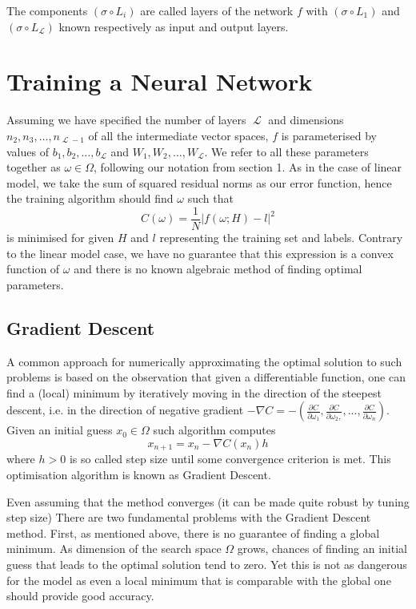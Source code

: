 \documentclass[a4paper]{article}
\theoremstyle{break}
\DeclareMathOperator{\La}{\mathcal{L}}
\begin{document}
The components $ (\sigma \circ L_{i}) $ are called layers of the network $f$ with $ (\sigma \circ L_{1}) $ and $ (\sigma \circ L_{\La}) $ known respectively as input and output layers.

\section{Training a Neural Network}

Assuming we have specified the number of layers $ \La $ and dimensions $ n_2, n_3, \ldots, n_{\La-1} $ of all the intermediate vector spaces,
$f$ is parameterised by values of $ b_1, b_2, \ldots, b_{\La} $ and $ W_1, W_2, \ldots, W_{\La} $.
We refer to all these parameters together as $ \omega \in \Omega $, following our notation from section 1.
As in the case of linear model, we take the sum of squared residual norms as our error function, hence the training algorithm should find $ \omega $ such that
    $$ C(\omega) =  \frac{1}{N} | f(\omega; H) - l |^2  $$
is minimised for given $H$ and $l$ representing the training set and labels.
Contrary to the linear model case, we have no guarantee that this expression is a convex function of $ \omega $ and there is no known algebraic method of finding optimal parameters.

\subsection{Gradient Descent}
A common approach for numerically approximating the optimal solution to such problems is based on the observation that given a differentiable function, one can find a (local) minimum by iteratively moving in the direction of the steepest descent, i.e. in the direction of negative gradient $ - \nabla C  = - ( \frac{\partial C}{\partial \omega_1}, \frac{\partial C}{\partial \omega_2, }, ..., \frac{\partial C}{\partial \omega_n})$. Given an initial guess $x_0 \in \Omega$ such algorithm computes
    $$ x_{n+1} = x_{n} - \nabla C (x_n) h $$
where $h > 0$ is so called step size until some convergence criterion is met. This optimisation algorithm is known as Gradient Descent.

Even assuming that the method converges (it can be made quite robust by tuning step size) There are two fundamental problems with the Gradient Descent method. First, as mentioned above, there is no guarantee of finding a global minimum. As dimension of the search space $ \Omega $ grows, chances of finding an initial guess that leads to the optimal solution tend to zero. Yet this is not as dangerous for the model as even a local minimum that is comparable with the global one should provide good accuracy.
\end{document}

